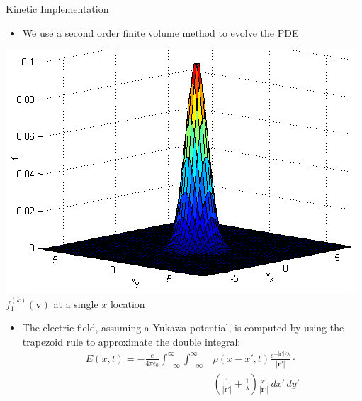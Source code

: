 \documentclass{beamer}
\begin{document}
	\begin{frame}{Kinetic Implementation}
		\begin{itemize}
			\item  We use a second order finite volume method to evolve the PDE\end{itemize}\begin{center}
			\includegraphics[height=0.3\textheight]{example_f.png}
			\\\tiny $f_1^{(k)}(\boldsymbol{v})$ at a single $x$ location
		\end{center}
			\begin{itemize}\item  The electric field, assuming a Yukawa potential, is computed by using the trapezoid rule to approximate the double integral:
			\begin{align*}E(x,t)=-\frac{e}{4\pi\epsilon_0}\int_{-\infty}^\infty\int_{-\infty}^\infty&\rho(x-x',t)\frac{e^{-|\mathbf{r}'|/\lambda}}{|\mathbf{r}'|}\cdot\\&\left(\frac{1}{|\mathbf{r}'|}+\frac{1}{\lambda}\right)\frac{x'}{|\mathbf{r}'|}\,dx'\,dy'
			\end{align*}

		\end{itemize}
	\let\thefootnote\relax{}
	\end{frame}
	
	
	
\end{document}
